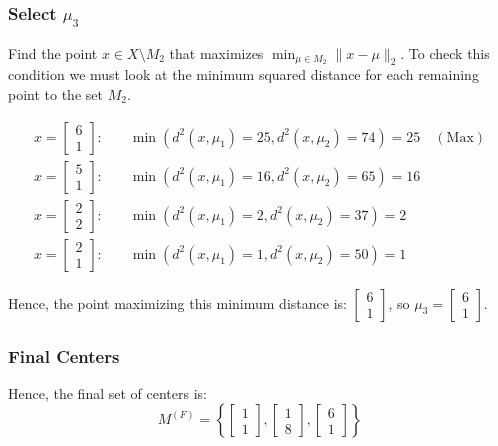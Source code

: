 \documentclass{article}
\begin{document}
\subsubsection*{Select $\mu_3$}
\begin{flushleft}
Find the point $x \in X \setminus M_2$ that maximizes $\min_{\mu \in M_2} \lVert x - \mu \rVert_2$. To check this condition we must look at the minimum squared distance for each remaining point to the set $M_2$.
\end{flushleft}
\begin{align*}
    x = \begin{bmatrix}6 \\ 1\end{bmatrix}:& \quad \min(d^2(x, \mu_1)=25, d^2(x, \mu_2)=74) = 25 \quad (\text{Max}) \\
    x = \begin{bmatrix}5 \\ 1\end{bmatrix}:& \quad \min(d^2(x, \mu_1)=16, d^2(x, \mu_2)=65) = 16 \\
    x = \begin{bmatrix}2 \\ 2\end{bmatrix}:& \quad \min(d^2(x, \mu_1)=2, d^2(x, \mu_2)=37) = 2 \\
    x = \begin{bmatrix}2 \\ 1\end{bmatrix}:& \quad \min(d^2(x, \mu_1)=1, d^2(x, \mu_2)=50) = 1
\end{align*}
\begin{flushleft}
Hence, the point maximizing this minimum distance is: $\begin{bmatrix}6 \\ 1\end{bmatrix}$, so $\mu_3 = \begin{bmatrix}6 \\ 1\end{bmatrix}$.
\end{flushleft}

\subsubsection*{Final Centers}
\begin{flushleft}
Hence, the final set of centers is:
$$ M^{(F)} = \left\{ \begin{bmatrix}1 \\ 1\end{bmatrix}, \begin{bmatrix}1 \\ 8\end{bmatrix}, \begin{bmatrix}6 \\ 1\end{bmatrix} \right\} $$
\end{flushleft}
\end{document}

